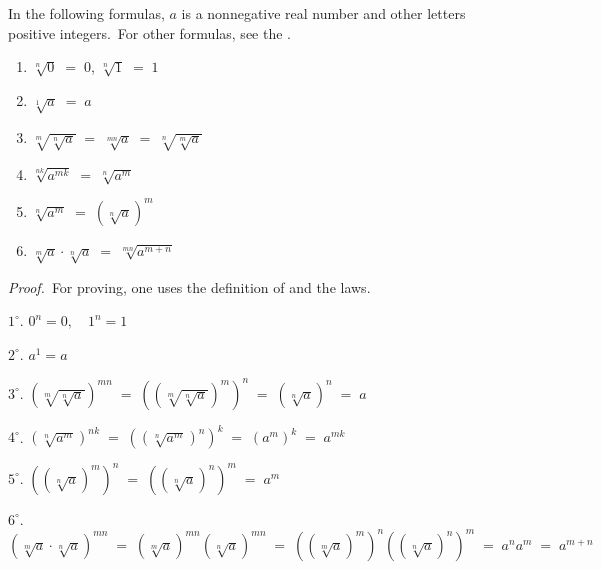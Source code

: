 \documentclass[12pt]{article}
\theoremstyle{definition}
\begin{document}

In the following formulas, $a$ is a nonnegative real number 
and other letters positive integers.\, For other formulas, see 
the .

\begin{enumerate}
\item $\sqrt[n]{0} \;=\; 0$, \qquad $\sqrt[n]{1} \;=\; 1$
\item $\sqrt[1]{a} \;=\; a$
\item $\sqrt[m]{\sqrt[n]{a}} \;=\; \sqrt[mn]{a} \;=\; \sqrt[n]{\sqrt[m]{a}}$
\item $\sqrt[nk]{a^{mk}} \;=\; \sqrt[n]{a^m}$
\item $\sqrt[n]{a^m} \;=\; (\sqrt[n]{a})^m$
\item $\sqrt[m]{a}\cdot\sqrt[n]{a} \;=\; \sqrt[mn]{a^{m+n}}$
\end{enumerate}

\emph{Proof.}\, For proving, one uses the definition of 
 and the  laws.

$1^\circ$.\; $0^n = 0, \quad 1^n = 1$

$2^\circ$.\; $a^1 = a$

$3^\circ$.\; $(\sqrt[m]{\sqrt[n]{a}})^{mn} \;=\; ((\sqrt[m]{\sqrt[n]{a}})^m)^n \;=\; (\sqrt[n]{a})^n \;=\; a$

$4^\circ$.\; $(\sqrt[n]{a^m})^{nk} \;=\; ((\sqrt[n]{a^m})^n)^k \;=\; (a^m)^k \;=\; a^{mk}$

$5^\circ$.\; $((\sqrt[n]{a})^m)^n \;=\; ((\sqrt[n]{a})^n)^m \;=\; a^m$

$6^\circ$.\; $(\sqrt[m]{a}\cdot\sqrt[n]{a})^{mn} \;=\; (\sqrt[m]{a})^{mn}(\sqrt[n]{a})^{mn} \;=\;
((\sqrt[m]{a})^m)^n((\sqrt[n]{a})^n)^m \;=\; a^na^m \;=\; a^{m+n}$
\end{document}
